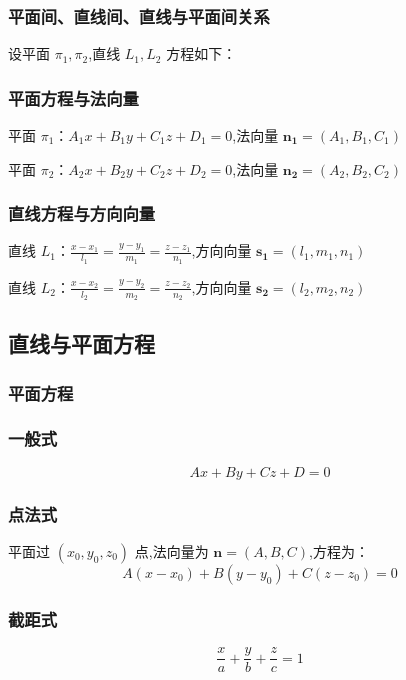 \documentclass[UTF8]{ctexart}
\theoremstyle{remark}
\begin{document}
			\subsubsection{平面间、直线间、直线与平面间关系}
			设平面 \(\pi_1, \pi_2\),直线 \(L_1, L_2\) 方程如下：  
			
			\subsubsection*{平面方程与法向量}
		平面 \(\pi_1\)：\(A_1x + B_1y + C_1z + D_1 = 0\),法向量 \(\boldsymbol{n_1} = (A_1, B_1, C_1)\)  
			
		平面 \(\pi_2\)：\(A_2x + B_2y + C_2z + D_2 = 0\),法向量 \(\boldsymbol{n_2} = (A_2, B_2, C_2)\)  
			
			\subsubsection*{直线方程与方向向量}
		直线 \(L_1\)：\(\frac{x - x_1}{l_1} = \frac{y - y_1}{m_1} = \frac{z - z_1}{n_1}\),方向向量 \(\boldsymbol{s_1} = (l_1, m_1, n_1)\)  
			
		直线 \(L_2\)：\(\frac{x - x_2}{l_2} = \frac{y - y_2}{m_2} = \frac{z - z_2}{n_2}\),方向向量 \(\boldsymbol{s_2} = (l_2, m_2, n_2)\)  
			
			\subsection{直线与平面方程}
			\subsubsection{平面方程}
			\subsubsection*{一般式}
			\[ Ax + By + Cz + D = 0 \]
			
			\subsubsection*{点法式}
			平面过 \((x_0, y_0, z_0)\) 点,法向量为 \(\boldsymbol{n} = (A, B, C)\),方程为：  
			\[ A(x - x_0) + B(y - y_0) + C(z - z_0) = 0 \]
			
			\subsubsection*{截距式}
			\[ \frac{x}{a} + \frac{y}{b} + \frac{z}{c} = 1 \]
			
\end{document}
